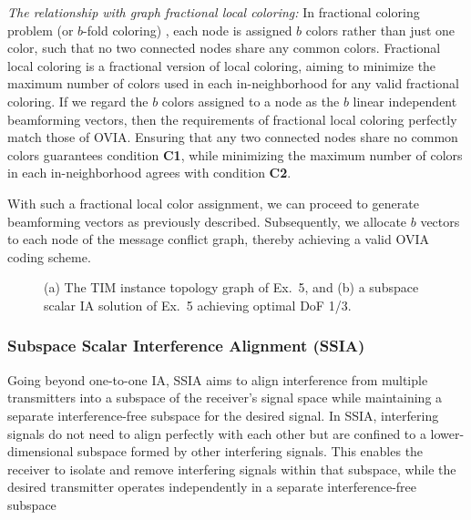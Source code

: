 \documentclass[a4paper,journal]{IEEEtran}
\begin{document}
\textit{The relationship with graph fractional local coloring:}
% 
In fractional coloring problem  (or $b$-fold coloring) \cite{scheinerman2011fractional}, each node is assigned $b$ colors rather than just one color, such that no two connected nodes share any common colors. Fractional local coloring is a fractional version of local coloring, aiming to minimize the maximum number of colors used in each in-neighborhood for any valid fractional coloring. If we regard the $b$ colors assigned to a node as the $b$ linear independent beamforming vectors, then the requirements of fractional local coloring perfectly match those of OVIA. Ensuring that any two connected nodes share no common colors guarantees condition \textbf{C1}, while minimizing the maximum number of colors in each in-neighborhood agrees with condition \textbf{C2}.

With such a fractional local color assignment, we can proceed to generate beamforming vectors as previously described. Subsequently, we allocate $b$ vectors to each node of the message conflict graph, thereby achieving a valid OVIA coding scheme.

\begin{figure}
   \centering
   \hfil
   \caption{(a) The TIM instance topology graph of Ex.~5, and (b) a subspace scalar IA solution of Ex.~5 achieving optimal DoF 1/3.}
   \label{4_nodes_sample_subspace_scalar}
\end{figure}

\subsubsection{Subspace Scalar Interference Alignment (SSIA)}
Going beyond one-to-one IA, SSIA aims to align interference from multiple transmitters into a subspace of the receiver's signal space while maintaining a separate interference-free subspace for the desired signal. In SSIA, interfering signals do not need to align perfectly with each other but are confined to a lower-dimensional subspace formed by other interfering signals. This enables the receiver to isolate and remove interfering signals within that subspace, while the desired transmitter operates independently in a separate interference-free subspace
\end{document}
